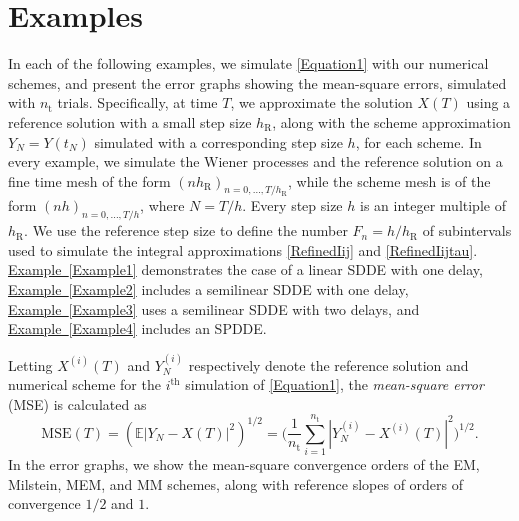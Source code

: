 \documentclass[onefignum]{siamart250211}
\providecommand{\abs}[1]{\left|#1\right|}
\begin{document}



\section{Examples}\label{Section4} In each of the following examples, we simulate \cref{Equation1} with our numerical schemes, and present the error graphs showing the mean-square errors, simulated with $n_\mathrm{t}$ trials. Specifically, at time $T$, we approximate the solution $X(T)$ using a reference solution with a small step size $h_\mathrm{R}$, along with the scheme approximation $Y_N=Y(t_N)$ simulated with a corresponding step size $h$, for each scheme. In every example, we simulate the Wiener processes and the reference solution on a fine time mesh of the form $(nh_\mathrm{R})_{n=0,\ldots,T/h_\mathrm{R}}$, while the scheme mesh is of the form $(nh)_{n=0,\ldots,T/h}$, where $N=T/h$. Every step size $h$ is an integer multiple of $h_\mathrm{R}$. We use the reference step size to define the number $F_n=h/h_\mathrm{R}$ of subintervals used to simulate the integral approximations \cref{RefinedIij} and \cref{RefinedIijtau}. \hyperref[Example1]{Example~\ref*{Example1}} demonstrates the case of a linear SDDE with one delay, \hyperref[Example2]{Example~\ref*{Example2}} includes a semilinear SDDE with one delay, \hyperref[Example3]{Example~\ref*{Example3}} uses a semilinear SDDE with two delays, and \hyperref[Example4]{Example~\ref*{Example4}} includes an SPDDE.

Letting $X^{(i)}(T)$ and $Y^{(i)}_N$ respectively denote the reference solution and numerical scheme for the $i^\mathrm{th}$ simulation of \cref{Equation1}, the \emph{mean-square error} (MSE) is calculated as
\begin{equation}
\mathrm{MSE}(T)=\left(\mathbb{E}\abs{Y_N-X(T)}^2\right)^{1/2}=\bigg(\frac{1}{n_\mathrm{t}}\sum_{i=1}^{n_\mathrm{t}}\abs{Y^{(i)}_N-X^{(i)}(T)}^2\bigg)^{1/2}.
\end{equation}
In the error graphs, we show the mean-square convergence orders of the EM, Milstein, MEM, and MM schemes, along with reference slopes of orders of convergence $1/2$ and $1$.
\end{document}
